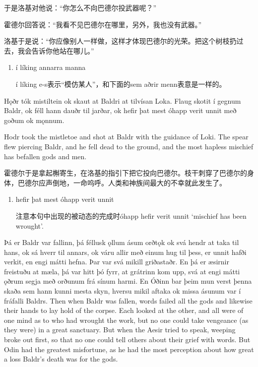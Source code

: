 \begin{translation*}{}
    于是洛基对他说：“你怎么不向巴德尔投武器呢？”

    霍德尔回答说：“我看不见巴德尔在哪里，另外，我也没有武器。”

    洛基于是说：“你应像别人一样做，这样才体现巴德尔的光荣。把这个树枝扔过去，我会告诉你他站在哪儿。”
\end{translation*}
\begin{grammar*}{}
    \begin{enumerate}[leftmargin=*]
        \item í líking annarra manna

              í líking e-s表示“模仿某人”，和下面的sem aðrir menn表意是一样的。
    \end{enumerate}
\end{grammar*}
\begin{paracol}{2}
    Hǫðr tók mistiltein ok skaut at Baldri at tilvísan Loka. Flaug skotit í gegnum Baldr, ok féll hann dauðr til jarðar, ok hefir þat mest óhapp verit unnit með goðum ok mǫnnum.

    \switchcolumn

    Hodr took the mistletoe and shot at Baldr with the guidance of Loki. The spear flew piercing Baldr, and he fell dead to the ground, and the most hapless mischief has befallen gods and men.
\end{paracol}
\begin{translation*}{}
    霍德尔于是拿起槲寄生，在洛基的指引下把它投向巴德尔。枝干刺穿了巴德尔的身体，巴德尔应声倒地，一命呜呼。人类和神族间最大的不幸就此发生了。
\end{translation*}
\begin{grammar*}{}
    \begin{enumerate}[leftmargin=*]
        \item hefir þat mest óhapp verit unnit

              注意本句中出现的被动态的完成时óhapp hefir verit unnit `mischief has been wrought'.
    \end{enumerate}
\end{grammar*}
\begin{paracol}{2}
    Þá er Baldr var fallinn, þá féllusk ǫllum ásum orðtǫk ok svá hendr at taka til hans, ok sá hverr til annars, ok váru allir með einum hug til þess, er unnit hafði verkit, en engi mátti hefna. Þar var svá mikill griðastaðr. En þá er æsirnir freistuðu at mæla, þá var hitt þó fyrr, at grátrinn kom upp, svá at engi mátti ǫðrum segja með orðunum frá sínum harmi. En Óðinn bar þeim mun verst þenna skaða sem hann kunni mesta skyn, hversu mikil aftaka ok missa ásunum var í fráfalli Baldrs.
    \switchcolumn
    Then when Baldr was fallen, words failed all the gods and likewise their hands to lay hold of the corpse. Each looked at the other, and all were of one mind as to who had wrought the work, but no one could take vengeance (as they were) in a great sanctuary. But when the Aesir tried to speak, weeping broke out first, so that no one could tell others about their grief with words. But Odin had the greatest misfortune, as he had the most perception about how great a loss Baldr's death was for the gods.
\end{paracol}
